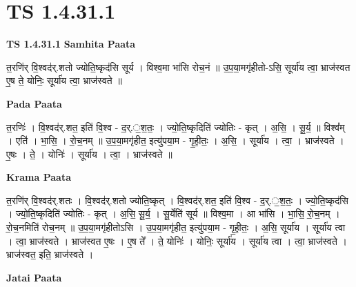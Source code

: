 \documentclass[17pt]{extarticle}
\begin{document}
\section{ TS 1.4.31.1 }

\textbf{TS 1.4.31.1 } \newline
\textbf{Samhita Paata} \newline

त॒रणि॑र् वि॒श्वद॑र्.शतो ज्योति॒ष्कृद॑सि सूर्य । विश्व॒मा भा॑सि रोच॒नं ॥ उ॒प॒या॒मगृ॑हीतो-ऽसि॒ सूर्या॑य त्वा॒ भ्राज॑स्वत ए॒ष ते॒ योनिः॒ सूर्या॑य त्वा॒ भ्राज॑स्वते ॥ \newline

\textbf{Pada Paata} \newline

त॒रणिः॑ । वि॒श्वद॑र्.शत॒ इति॑ वि॒श्व - द॒र्.॒श॒तः॒ । ज्यो॒ति॒ष्कृदिति॑ ज्योतिः - कृत् । अ॒सि॒ । सू॒र्य॒ ॥ विश्व᳚म् । एति॑ । भा॒सि॒ । रो॒च॒नम् ॥ उ॒प॒या॒मगृ॑हीत॒ इत्यु॑पया॒म - गृ॒ही॒तः॒ । अ॒सि॒ । सूर्या॑य । त्वा॒ । भ्राज॑स्वते । ए॒षः । ते॒ । योनिः॑ । सूर्या॑य । त्वा॒ । भ्राज॑स्वते ॥  \newline


\textbf{Krama Paata} \newline

त॒रणि॑र् वि॒श्वद॑र्.शतः । वि॒श्वद॑र्.शतो ज्योति॒ष्कृत् । वि॒श्वद॑र्.शत॒ इति॑ वि॒श्व - द॒र्.॒श॒तः॒ । ज्यो॒ति॒ष्कृद॑सि । ज्यो॒ति॒ष्कृदिति॑ ज्योतिः - कृत् । अ॒सि॒ सू॒र्य॒ । सू॒र्येति॑ सूर्य ॥ विश्व॒मा । आ भा॑सि । भा॒सि॒ रो॒च॒नम् । रो॒च॒नमिति॑ रोच॒नम् ॥ उ॒प॒या॒मगृ॑हीतोऽसि । उ॒प॒या॒मगृ॑हीत॒ इत्यु॑पया॒म - गृ॒ही॒तः॒ । अ॒सि॒ सूर्या॑य । सूर्या॑य त्वा । त्वा॒ भ्राज॑स्वते । भ्राज॑स्वत ए॒षः । ए॒ष ते᳚ । ते॒ योनिः॑ । योनिः॒ सूर्या॑य । सूर्या॑य त्वा । त्वा॒ भ्राज॑स्वते । भ्राज॑स्वत॒ इति॒ भ्राज॑स्वते । \newline

\textbf{Jatai Paata} \newline
\end{document}
